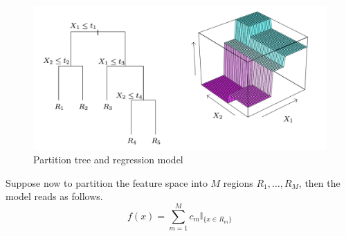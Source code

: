 \begin{figure}
\includegraphics[width=1\textwidth]{images/elsii2.png}
\caption{Partition tree and regression model \cite{hastie2009elements}}
\label{fig:elements_statistical_learning2}
\end{figure}

Suppose now to partition the feature space into $M$ regions $R_1,\dots,R_M$, then the model reads as follows.
\begin{equation}
    f(x)=\sum\limits_{m=1}^{M}c_m\mathbb{I}_{\{x \in R_m\}}
\end{equation}

